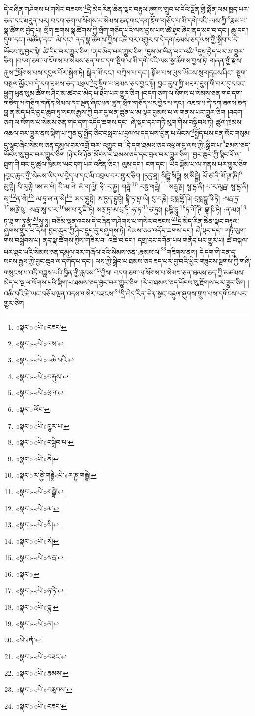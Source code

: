 དེ་བཞིན་གཤེགས་པ་གསེར་བཟངས་\footnote{«སྣར་»«པེ་»བཟང་}དྲི་མེད་རིན་ཆེན་སྣང་བརྟུལ་ཞུགས་གྲུབ་པ་དེའི་སྔོན་གྱི་སྨོན་ལམ་ཁྱད་པར་ཅན་དང་མཐུན་པར། བདག་ཅག་ལ་སོགས་པ་སེམས་ཅན་གང་དག་སྲོག་གཅོད་པ་མི་དགེ་བའི་:ལས་ཀྱི་\footnote{«སྣར་»«པེ་»ལས་}རྣམ་པ་སྣ་ཚོགས་བྱེད་པ། སྲོག་ཆགས་སྣ་ཚོགས་ཀྱི་སྲོག་གཅོད་པའི་ལས་བྱས་པས་ཚེ་ཐུང་ཞིང་ནད་མང་བ་དང་། ཆུ་དང་། དུག་དང་། མཚོན་དང་། མེ་དང་། ནད་སྣ་ཚོགས་ཀྱིས་འཆི་བར་འགྱུར་བ་དེ་དག་ཐམས་ཅད་ལས་ཀྱི་སྒྲིབ་པ་དེ་ཡོངས་སུ་བྱང་སྟེ། ཚེ་རིང་བར་གྱུར་ཅིག །ནད་མེད་པར་གྱུར་ཅིག །དུས་མ་ཡིན་པར་འཆི་\footnote{«སྣར་»«པེ་»འཆི་བའི་}དུས་བྱེད་པར་མ་གྱུར་ཅིག །བདག་ཅག་ལ་སོགས་པ་སེམས་ཅན་གང་དག་སྡིག་པ་མི་དགེ་བའི་ལས་སྣ་ཚོགས་བྱས་ཏེ། གཞན་གྱི་རྫས་རྐུས་\footnote{«སྣར་»«པེ་»བརྐུས་}ཕྲོགས་པས་དབུལ་པོར་སྐྱེས་ཏེ། སྒྲེན་མོ་དང་། བཀྲེས་པ་དང་། སྐོམ་པས་ལུས་ཡོངས་སུ་གདུངས་ཤིང་། སྡུག་བསྔལ་མྱོང་བ་དེ་དག་ཐམས་ཅད་འཕྲལ་\footnote{«སྣར་»«པེ་»ཕྲལ་}དུ་སྡིག་པ་ཐམས་ཅད་བྱང་སྟེ། བྱང་ཆུབ་ཀྱི་མཐར་ཐུག་གི་བར་དུ་དབང་ཕྱུག་ཕུན་སུམ་ཚོགས་ཤིང་མ་ཚང་བ་མེད་པ་ཐོབ་པར་གྱུར་ཅིག །བདག་ཅག་ལ་སོགས་པ་སེམས་ཅན་གང་དག་གཅིག་ལ་གཅིག་གནོད་སེམས་དང་ལྡན་ཞིང་ཕན་ཚུན་སྲོག་གཅོད་པར་བྱེད་པ་དང་། འཐབ་པ་དེ་དག་ཐམས་ཅད་བླ་ན་མེད་པའི་བྱང་ཆུབ་ཏུ་སངས་རྒྱས་ཀྱི་བར་དུ་ཕན་ཚུན་ཕ་མ་ལྟར་བྱམས་པ་ལ་གནས་པར་གྱུར་ཅིག །བདག་ཅག་ལ་སོགས་པ་སེམས་ཅན་གང་དག་འདོད་ཆགས་དང་། ཞེ་སྡང་དང་གཏི་མུག་གིས་བསྒྲིབས་ཏེ། ཚུལ་ཁྲིམས་འཆལ་བར་གྱུར་ནས་སྡིག་པ་ཀུན་དུ་སྤྱོད་ཅིང་བསླབ་པ་དྲལ་ལ་དད་པས་བྱིན་པ་ལོངས་\footnote{«སྣར་»ལོང་}སྤྱོད་པས་ངན་སོང་གསུམ་དུ་ལྷུང་ཞིང་སེམས་ཅན་དམྱལ་བར་འགྲོ་བར་:འགྱུར་བ་\footnote{«སྣར་»«པེ་»གྱུར་པ་}དེ་དག་ཐམས་ཅད་འཕྲལ་དུ་ལས་ཀྱི་:སྒྲིབ་པ་\footnote{«སྣར་»«པེ་»བསྒྲིབ་པ་}ཐམས་ཅད་ཡོངས་སུ་བྱང་བར་གྱུར་ཅིག །ཉེ་བའི་ཉོན་མོངས་པ་ཐམས་ཅད་དང་བྲལ་བར་གྱུར་ཅིག །བྱང་ཆུབ་ཀྱི་སྙིང་པོ་ལ་ཐུག་གི་བར་དུ་ཚུལ་ཁྲིམས་ཡང་དག་པར་འཛིན་ཅིང་། ལུས་དང་། ངག་དང་། ཡིད་སྡོམ་པ་ལ་གནས་པར་གྱུར་ཅིག །བྱང་ཆུབ་ཀྱི་སེམས་ཡིད་ལ་བྱེད་པ་དང་མི་འབྲལ་བར་གྱུར་ཅིག །ཏདྱ་ཐཱ། སིདྡྷེ་སིདྡྷེ། སུ་སིདྡྷེ། མོ་ཙ་ནི་མོ་ཀྵ་ཎི།\footnote{«སྣར་»«པེ་»ནི།} མུཀྟེ། བི་མུཀྟེ །ཨ་མ་ལེ། བི་མ་ལེ། མཾ་ག་ལྱེ། ཧི་:ར་ཎྱ། གརྦྦེ།\footnote{«སྣར་»ར་ཎྱེ་གརྦྷེ«པེ་»ར་ཎྱ་གརྦྷེ།} རཏྣ་གརྦྦེ།\footnote{«སྣར་»«པེ་»གརྦྷེ།} སརྦཱ་རྠ། སཱ་དྷ་ནི། པ་ར་མཱརྠ། སཱ་དྷ་ནི། མཱ་\footnote{«སྣར་»«པེ་»མ་}ན་སེ།\footnote{«སྣར་»«པེ་»སི།} མ་ཧཱ་མ་ན་སེ།\footnote{«སྣར་»«པེ་»སི།} ཨད་བྷུཏྟེ། ཨ་ཏྱད་བྷུཏྟེ། བྷཱི་ཏ་བྷ་ཡེ། སུ་བརྞེ། བྲཧྨ་གྷོ་ཥེ། བྲཧྨ་དྷྱུ་ཥི་ཏེ། :སརྦ་ཏྲ་\footnote{«སྣར་»«པེ་»སརྦ་}ཨརྠེ་ཥུ། :སརྦ་ཨཱ་བ་ར་\footnote{«སྣར་»}ཨ་པ་རཱ་ཛི་ཏེ། སརྦ་ཏྲ་ཨ་པྲ་ཏི་:ཧ་ཏ་\footnote{«སྣར་»«པེ་»ཧ་ཏེ་}ཙ་ཏུཿ། ཥཥྚི་བྷཱུ་\footnote{«སྣར་»«པེ་»བྷུ་}ཏ་ཀོ་ཊི། བྷཱ་ཥི་ཏེ། :ན་མཿ།\footnote{«སྣར་»«པེ་»ན།} ཏ་ཐཱ་ག་ཏཱ་ནཱཾ་\footnote{«པེ་»ནཾ་}སྭཱ་ཧཱ། བཅོམ་ལྡན་འདས་དེ་བཞིན་གཤེགས་པ་གསེར་བཟངས་\footnote{«སྣར་»«པེ་»བཟང་}དྲི་མེད་རིན་ཆེན་སྣང་བརྟུལ་ཞུགས་གྲུབ་པ་དེས། བྱང་ཆུབ་ཀྱི་ཤིང་དྲུང་དུ་བཞུགས་ཏེ། སེམས་ཅན་འདོད་ཆགས་དང་། ཞེ་སྡང་དང་། གཏི་མུག་གིས་བསྒྲིབས་པ། ནད་སྣ་ཚོགས་ཀྱིས་གཟིར་བ། འཆི་བ་དང་། དགྲ་དང་དགོན་པས་གནོད་པར་གྱུར་པ། ཚེ་བསྐལ་པར་ཐུབ་པའི་སེམས་ཅན་དམྱལ་བར་གཞོལ་བའི་སེམས་ཅན་:རྣམས་ལ་\footnote{«སྣར་»«པེ་»རྣམས་}གཟིགས་ནས། དེ་དག་གི་དན་དུ་སངས་རྒྱས་ཀྱི་བྱང་ཆུབ་ལ་དགོད་པ་དང་། ལས་ཀྱི་སྒྲིབ་པ་ཐམས་ཅད་ཟད་པར་བྱ་བའི་ཕྱིར་གཟུངས་སྔགས་ཀྱི་གཞི་གསུངས་པ་འདི་བཟླས་པའི་བྱིན་གྱི་རླབས་\footnote{«སྣར་»«པེ་»བརླབས་}ཀྱིས། བདག་ཅག་ལ་སོགས་པ་སེམས་ཅན་ཐམས་ཅད་ཀྱི་མཚམས་མེད་པ་ལྔ་ལ་སོགས་པའི་སྡིག་པ་ཐམས་ཅད་བྱང་བར་གྱུར་ཅིག །རེ་བ་ཐམས་ཅད་ཡོངས་སུ་རྫོགས་པར་གྱུར་ཅིག །འཆི་བའི་ཚེ་ཡང་བཅོམ་ལྡན་འདས་གསེར་བཟངས་\footnote{«སྣར་»«པེ་»བཟང་}དྲི་མེད་རིན་ཆེན་སྣང་བརྟུལ་ཞུགས་གྲུབ་པས་དགོངས་པར་གྱུར་ཅིག 